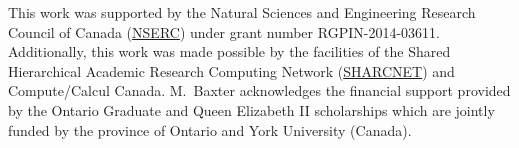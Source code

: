\documentclass[aps, pra, reprint, groupedaddress, amsfonts, longbibliography,
               amsmath, amssymb, showpacs, nofootinbib]{revtex4-1}
\begin{document}
\begin{acknowledgments}

   This work was supported by the Natural Sciences and Engineering Research Council
   of Canada (\href{http://www.nserc-crsng.gc.ca/}{NSERC}) under grant number RGPIN-2014-03611.
   Additionally, this work was made possible by the facilities of the Shared Hierarchical Academic
   Research Computing Network (\href{www.sharcnet.ca}{SHARCNET}) and Compute/Calcul Canada. M.\ Baxter
   acknowledges the financial support provided by the Ontario Graduate and Queen Elizabeth \textsc{II}
   scholarships which are jointly funded by the province of Ontario and York University (Canada).

\end{acknowledgments}


\end{document}
